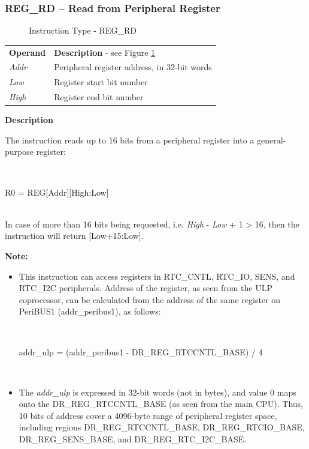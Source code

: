 \documentclass[main\_\_EN.tex]{subfiles}
\begin{document}
\subsubsection{REG\_RD – Read from Peripheral Register} \label{subsection:REG_RD}

%
%
%
%
%
\begin{figure}[!ht ]
    \centering
    \caption{Instruction Type - REG\_RD}
    \label{figure:REG_RD}
\end{figure}


\begin{tabular}{ l l }
\textbf{Operand} & \textbf{Description} - see Figure \ref{figure:REG_RD} \\
\textit{Addr} & Peripheral register address, in 32-bit words \\
\textit{Low} & Register start bit number \\
\textit{High} & Register end bit number \\
\end{tabular}

\textbf{Description}

The instruction reads up to 16 bits from a peripheral register into a general-purpose register:

~
\begin{centering}
    R0 = REG[Addr][High:Low] \\
\end{centering}
~\\
In case of more than 16 bits being requested, i.e. \textit{High} - \textit{Low} + 1 > 16, then the instruction will return [Low+15:Low].

\textbf{Note:}
\begin{itemize}
    \item This instruction can access registers in RTC\_CNTL, RTC\_IO, SENS, and RTC\_I2C peripherals. Address of the register, as seen from the ULP coprocessor, can be calculated from the address of the same register on PeriBUS1 (addr\_peribus1), as follows:

    ~
    \begin{centering}
        addr\_ulp = (addr\_peribus1 - DR\_REG\_RTCCNTL\_BASE) / 4 \\
    \end{centering}
    ~

    \item The \textit{addr\_ulp} is expressed in 32-bit words (not in bytes), and value 0 maps onto the DR\_REG\_RTCCNTL\_BASE (as seen from the main CPU). Thus, 10 bits of address cover a 4096-byte range of peripheral register space, including regions DR\_REG\_RTCCNTL\_BASE, DR\_REG\_RTCIO\_BASE, DR\_REG\_SENS\_BASE, and DR\_REG\_RTC\_I2C\_BASE.
\end{itemize}
\end{document}
